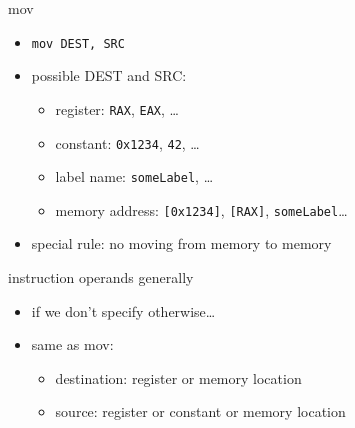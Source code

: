 \begin{frame}[fragile,label=mov]{mov}
\lstset{language=myasm}
\begin{itemize}
\item \lstinline|mov DEST, SRC|
\item possible DEST and SRC:
\begin{itemize}
\item register: \texttt{RAX}, \texttt{EAX}, \ldots
\item constant: \texttt{0x1234}, \texttt{42}, \ldots
\item label name: \texttt{someLabel}, \ldots
\item memory address: \texttt{[0x1234]}, \texttt{[RAX]}, \texttt{someLabel}\ldots
\end{itemize}
\item special rule: no moving from memory to memory
\end{itemize}
\end{frame}

\begin{frame}{instruction operands generally}
\begin{itemize}
\item if we don't specify otherwise\ldots
\item same as mov:
    \begin{itemize}
    \item destination: register or memory location
    \item source: register or constant or memory location
    \end{itemize}
\end{itemize}
\end{frame}
